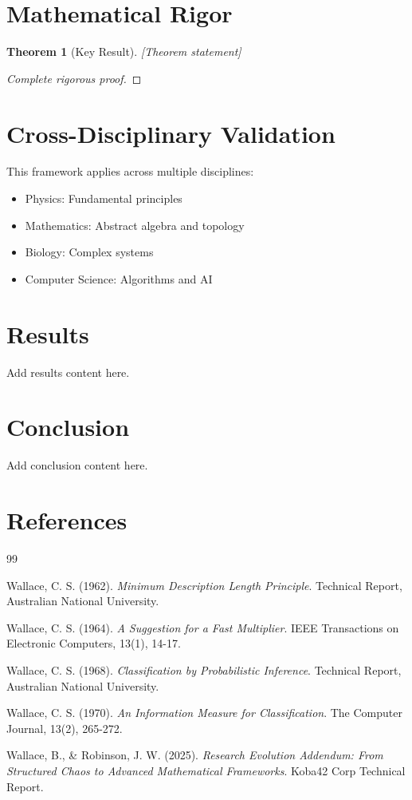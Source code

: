 \documentclass[12pt]{article}
\newtheorem{theorem}{Theorem}
\begin{document}
\section{Mathematical Rigor}

\begin{theorem}[Key Result]
[Theorem statement]
\end{theorem}

\begin{proof}
[Complete rigorous proof]
\end{proof}


\section{Cross-Disciplinary Validation}

This framework applies across multiple disciplines:
\begin{itemize}
    \item Physics: Fundamental principles
    \item Mathematics: Abstract algebra and topology
    \item Biology: Complex systems
    \item Computer Science: Algorithms and AI
\end{itemize}

\section{Results}
\label{sec:results}

Add results content here.


\section{Conclusion}
\label{sec:conclusion}

Add conclusion content here.

\section{References}

\begin{thebibliography}{99}

Wallace, C. S. (1962). \textit{Minimum Description Length Principle}. Technical Report, Australian National University.

Wallace, C. S. (1964). \textit{A Suggestion for a Fast Multiplier}. IEEE Transactions on Electronic Computers, 13(1), 14-17.

Wallace, C. S. (1968). \textit{Classification by Probabilistic Inference}. Technical Report, Australian National University.

Wallace, C. S. (1970). \textit{An Information Measure for Classification}. The Computer Journal, 13(2), 265-272.

Wallace, B., \& Robinson, J. W. (2025). \textit{Research Evolution Addendum: From Structured Chaos to Advanced Mathematical Frameworks}. Koba42 Corp Technical Report.

\end{thebibliography}
\end{document}
